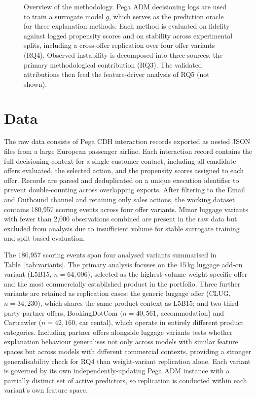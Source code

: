 \documentclass[oneside]{memoir} %
\begin{document}
\begin{figure}[ht]
\caption{Overview of the methodology. Pega ADM decisioning logs are used to train a
surrogate model $g$, which serves as the prediction oracle for three explanation methods. Each method is evaluated on fidelity against logged propensity scores and on stability across experimental splits, including a cross-offer replication over four offer variants (RQ4). Observed instability is decomposed into three sources, the primary methodological contribution (RQ3). The validated attributions then feed the feature-driver analysis of RQ5 (not shown).}
\label{fig:methodology_overview}
\end{figure}

\section{Data} \label{sec:data}

The raw data consists of Pega CDH interaction records exported as nested JSON files from a large European passenger airline. Each interaction record contains the full decisioning context for a single customer contact, including all candidate offers evaluated, the selected action, and the propensity scores assigned to each offer. Records are parsed and deduplicated on a unique execution identifier to prevent double-counting across overlapping exports. After filtering to the Email and Outbound channel and retaining only sales actions, the working dataset contains 180,957 scoring events across four offer variants. Minor luggage variants with fewer than 2,000 observations combined are present in the raw data but excluded from analysis due to insufficient volume for stable surrogate training and split-based evaluation.

The 180,957 scoring events span four analysed variants summarised in Table~\ref{tab:variants}. The primary analysis focuses on the 15\,kg luggage add-on variant (L5B15, $n = 64{,}006$), selected as the highest-volume weight-specific offer and the most commercially established product in the portfolio. Three further variants are retained as replication cases: the generic luggage offer (CLUG, $n = 34{,}230$), which shares the same product context as L5B15; and two third-party partner offers, BookingDotCom ($n = 40{,}561$, accommodation) and Cartrawler ($n = 42{,}160$, car rental), which operate in entirely different product categories. Including partner offers alongside luggage variants tests whether explanation behaviour generalises not only across models with similar feature spaces but across models with different commercial contexts, providing a stronger generalisability check for RQ4 than weight-variant replication alone. Each variant is governed by its own independently-updating Pega ADM instance with a partially distinct set of active predictors, so replication is conducted within each variant's own feature space.
\end{document}
